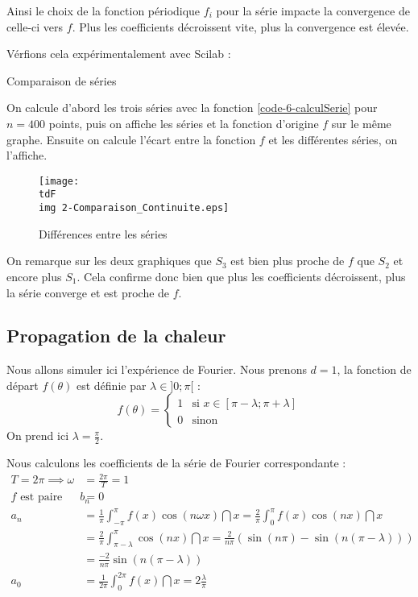		Ainsi le choix de la fonction périodique $f_i$ pour la série impacte la convergence de celle-ci vers $f$. Plus les coefficients décroissent vite, plus la convergence est élevée.
		
		Vérfions cela expérimentalement avec Scilab :

		\begin{listing}[H]
			\caption{Comparaison de séries}
			\label{code-6-compContinuite}
		\end{listing}

		On calcule d'abord les trois séries avec la fonction \ref{code-6-calculSerie} pour $n=400$ points, puis on affiche les séries et la fonction d'origine $f$ sur le même graphe. Ensuite on calcule l'écart entre la fonction $f$ et les différentes séries, on l'affiche.

		\begin{figure}[H]
			\centering
			\texttt{[image: \\tdF\\img 2-Comparaison\_Continuite.eps]}
			\caption{Différences entre les séries}
			\label{img-5-compContSeries}
		\end{figure}

		On remarque sur les deux graphiques que $S_3$ est bien plus proche de $f$ que $S_2$ et encore plus $S_1$. Cela confirme donc bien que plus les coefficients décroissent, plus la série converge et est proche de $f$.

	\subsection{Propagation de la chaleur}
		
		Nous allons simuler ici l'expérience de Fourier.
		Nous prenons $d=1$, la fonction de départ $f(\theta)$ est définie par $\lambda\in]0;\pi[$ :
		$$
			f(\theta) = \begin{cases}
				1	&	\text{si } x\in[\pi-\lambda; \pi+\lambda]		\\
				0	&	\text{sinon}
			\end{cases}
		$$
		On prend ici $\lambda = \frac{\pi}{2}$.

		Nous calculons les coefficients de la série de Fourier correspondante :
		\begin{align*}
			T = 2\pi \implies \omega &= \frac{2\pi}{T} = 1 \\
			f \text{ est paire donc } b_n &= 0 \\
			a_n &= \frac{1}{\pi} \int_{-\pi}^{\pi} f(x) \cos(n\omega x) \dint{x}
				= \frac{2}{\pi} \int_0^\pi f(x) \cos(n x) \dint{x}	\\
				&= \frac{2}{\pi} \int_{\pi-\lambda}^\pi \cos(n x) \dint{x}
				= \frac{2}{n\pi} \left( \sin(n\pi)-\sin(n(\pi - \lambda)) \right) \\
				&= \frac{-2}{n\pi} \sin(n(\pi-\lambda)) \\
			a_0 &= \frac{1}{2\pi} \int_0^{2\pi} f(x) \dint{x} = 2 \frac{\lambda}{\pi}
		\end{align*}
		
